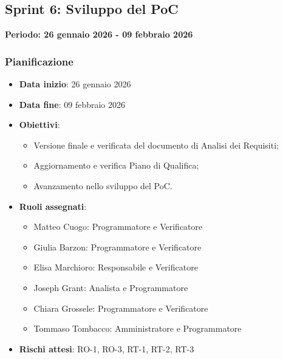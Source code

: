 \documentclass[11pt,a4paper]{article}
\begin{document}
\newpage
\subsection{Sprint 6: Sviluppo del PoC}
{\textbf{Periodo: 26 gennaio 2026 - 09 febbraio 2026}\par}

\subsubsection{Pianificazione}
\begin{itemize}
    \item \textbf{Data inizio}: 26 gennaio 2026
    \item \textbf{Data fine}: 09 febbraio 2026
    \item \textbf{Obiettivi}:
    \begin{itemize}
        \item Versione finale e verificata del documento di Analisi dei Requisiti;
        \item Aggiornamento e verifica Piano di Qualifica;
        \item Avanzamento nello sviluppo del PoC.
    \end{itemize}
    \item \textbf{Ruoli assegnati}:
    \begin{itemize}
        \item Matteo Cuogo: Programmatore e Verificatore 
        \item Giulia Barzon: Programmatore e Verificatore
        \item Elisa Marchioro: Responsabile e Verificatore
        \item Joseph Grant: Analista e Programmatore
        \item Chiara Grossele: Programmatore e Verificatore
        \item Tommaso Tombacco: Amministratore e Programmatore 
    \end{itemize}
    \item \textbf{Rischi attesi}: RO-1, RO-3, RT-1, RT-2, RT-3
\end{itemize}
\end{document}
